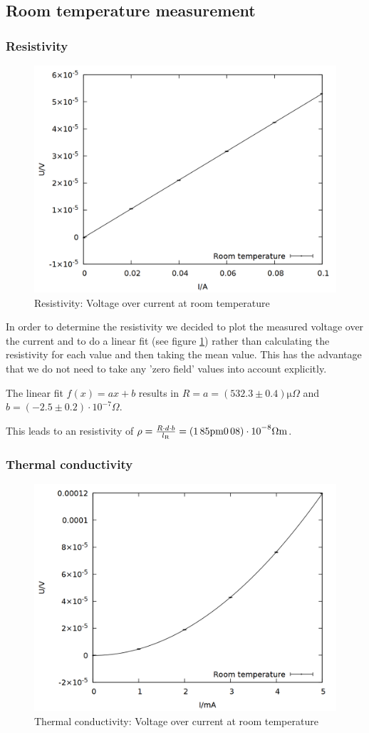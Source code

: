 \subsection{Room temperature measurement}

\subsubsection{Resistivity}
\begin{figure}
    \centering
    \includegraphics[width=0.7\linewidth]{data/elec.png}
    \caption{Resistivity: Voltage over current at room temperature}
    \label{fig:elec}
\end{figure}

In order to determine the resistivity we decided to plot the measured voltage over the current and to do a linear fit (see figure \ref{fig:elec}) rather than calculating the resistivity for each value and then taking the mean value. This has the advantage that we do not need to take any 'zero field' values into account explicitly.

The linear fit $f(x) = ax+b$ results in  $R = a = \si{(532.3\pm 0.4) \micro \Omega}$ and  $b = \si{(-2.5 \pm 0.2) \cdot 10^{-7} \Omega}$.

This leads to an resistivity of $\rho = \frac{R \cdot d \cdot b}{l\ind{R}} = \si{(1.85 \pm 0.08) \cdot 10^{-8} \Omega\meter}$.

\subsubsection{Thermal conductivity}

\begin{figure}
    \centering
    \includegraphics[width=0.7\linewidth]{data/therm.png}
    \caption{Thermal conductivity: Voltage over current at room temperature}
    \label{fig:therm}
\end{figure}

